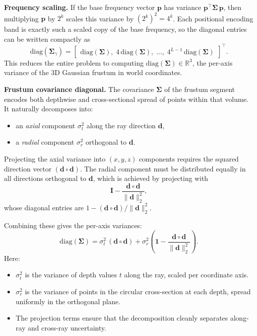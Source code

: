 \begin{enrichment}
\begin{enrichment}
    \medskip
    \noindent
    \textbf{Frequency scaling.}  
    If the base frequency vector $\mathbf{p}$ has variance $\mathbf{p}^\top \boldsymbol{\Sigma} \, \mathbf{p}$, then multiplying $\mathbf{p}$ by $2^k$ scales this variance by $(2^k)^2 = 4^k$. Each positional encoding band is exactly such a scaled copy of the base frequency, so the diagonal entries can be written compactly as
    \[
    \mathrm{diag}(\boldsymbol{\Sigma}_\gamma) =
    \begin{bmatrix}
        \mathrm{diag}(\boldsymbol{\Sigma}), \;
        4 \, \mathrm{diag}(\boldsymbol{\Sigma}), \;
        \dots, \;
        4^{L-1} \, \mathrm{diag}(\boldsymbol{\Sigma})
    \end{bmatrix}^\top.
    \]
    This reduces the entire problem to computing $\mathrm{diag}(\boldsymbol{\Sigma}) \in \mathbb{R}^3$, the per-axis variance of the 3D Gaussian frustum in world coordinates.
    
    \medskip
    \noindent
    \textbf{Frustum covariance diagonal.}  
    The covariance $\boldsymbol{\Sigma}$ of the frustum segment encodes both depthwise and cross-sectional spread of points within that volume. It naturally decomposes into:
    \begin{itemize}
        \item an \emph{axial} component $\sigma_t^2$ along the ray direction $\mathbf{d}$,  
        \item a \emph{radial} component $\sigma_r^2$ orthogonal to $\mathbf{d}$.
    \end{itemize}
    Projecting the axial variance into $(x,y,z)$ components requires the squared direction vector $(\mathbf{d} \circ \mathbf{d})$. The radial component must be distributed equally in all directions orthogonal to $\mathbf{d}$, which is achieved by projecting with
    \[
    \mathbf{I} - \frac{\mathbf{d} \circ \mathbf{d}}{\|\mathbf{d}\|_2^2},
    \]
    whose diagonal entries are $1 - (\mathbf{d} \circ \mathbf{d}) / \|\mathbf{d}\|_2^2$.  
    
    Combining these gives the per-axis variances:
    \[
    \mathrm{diag}(\boldsymbol{\Sigma})
    = \sigma_t^2 \, (\mathbf{d} \circ \mathbf{d})
    + \sigma_r^2 \left( \mathbf{1} - \frac{\mathbf{d} \circ \mathbf{d}}{\|\mathbf{d}\|_2^2} \right).
    \]
    Here:
    \begin{itemize}
        \item $\sigma_t^2$ is the variance of depth values $t$ along the ray, scaled per coordinate axis.
        \item $\sigma_r^2$ is the variance of points in the circular cross-section at each depth, spread uniformly in the orthogonal plane.
        \item The projection terms ensure that the decomposition cleanly separates along-ray and cross-ray uncertainty.
    \end{itemize}
    

\end{enrichment}
\end{enrichment}
